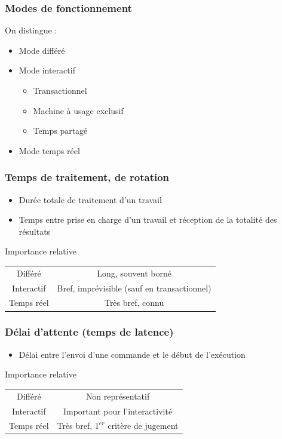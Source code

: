 \begin{frame}
\frametitle{Modes de fonctionnement}
On distingue :
\begin{itemize}
\item Mode différé
\item Mode interactif
\begin{itemize}
\item Transactionnel
\item Machine à usage exclusif
\item Temps partagé
\end{itemize}
\item Mode temps réel
\end{itemize}
\end{frame}

\begin{frame}
\frametitle{Temps de traitement, de rotation}
\begin{itemize}
\item Durée totale de traitement d'un travail
\item Temps entre prise en charge d'un travail et réception de la totalité des résultats
\end{itemize}
\begin{block}{Importance relative}
\begin{tabular}{c|c}
Différé & Long, souvent borné \\
Interactif & Bref, imprévisible (sauf en transactionnel) \\
Temps réel & Très bref, connu \\
\end{tabular}
\end{block}
\end{frame}

\begin{frame}
\frametitle{Délai d’attente (temps de latence)}
\begin{itemize}
\item Délai entre l’envoi d’une commande et le début de l’exécution
\end{itemize}
\begin{block}{Importance relative}
\begin{tabular}{c|c}
Différé & Non représentatif \\
Interactif & Important pour l’interactivité \\
Temps réel & Très bref, $1^{er}$ critère de jugement \\
\end{tabular}
\end{block}
\end{frame}

